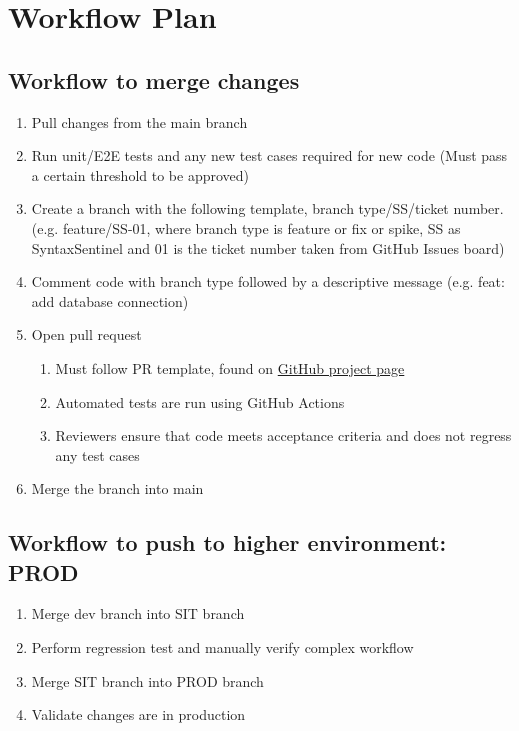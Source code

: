 \documentclass{article}
\begin{document}
\section{Workflow Plan}

\subsection{Workflow to merge changes}
\begin{enumerate}
    \item Pull changes from the main branch
    \item Run unit/E2E tests and any new test cases required for new code (Must pass a certain threshold to be approved)
    \item Create a branch with the following template, branch type/SS/ticket number. (e.g. feature/SS-01, where branch type is feature or fix or spike, SS as SyntaxSentinel and 01 is the ticket number taken from GitHub Issues board)
    \item Comment code with branch type followed by a descriptive message (e.g. feat: add database connection)
    \item Open pull request
        \begin{enumerate}
            \item Must follow PR template, found on \href{https://github.com/lilweege/SyntaxSentinels/blob/main/.github/pull_request_template.md}{GitHub project page}
            \item Automated tests are run using GitHub Actions
            \item Reviewers ensure that code meets acceptance criteria and does not regress any test cases
        \end{enumerate}
    \item Merge the branch into main
\end{enumerate}

\subsection{Workflow to push to higher environment: PROD}
\begin{enumerate}
    \item Merge dev branch into SIT branch
    \item Perform regression test and manually verify complex workflow
    \item Merge SIT branch into PROD branch
    \item Validate changes are in production
\end{enumerate}
\end{document}
